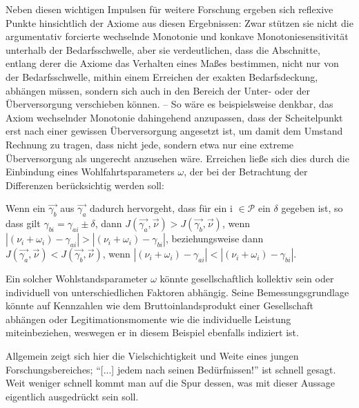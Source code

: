 \documentclass[a4paper]{thesis}
\begin{document}
Neben diesen wichtigen Impulsen für weitere Forschung ergeben sich reflexive Punkte hinsichtlich der Axiome aus diesen Ergebnissen: Zwar stützen sie nicht die argumentativ forcierte wechselnde Monotonie und konkave Monotoniesensitivität unterhalb der Bedarfsschwelle, aber sie verdeutlichen, dass die Abschnitte, entlang derer die Axiome das Verhalten eines Maßes bestimmen, nicht nur von der Bedarfsschwelle, mithin einem Erreichen der exakten Bedarfsdeckung, abhängen müssen, sondern sich auch in den Bereich der Unter- oder der Überversorgung verschieben können. -- So wäre es beispielsweise denkbar, das Axiom wechselnder Monotonie dahingehend anzupassen, dass der Scheitelpunkt erst nach einer gewissen Überversorgung angesetzt ist, um damit dem Umstand Rechnung zu tragen, dass nicht jede, sondern etwa nur eine extreme Überversorgung als ungerecht anzusehen wäre. Erreichen ließe sich dies durch die Einbindung eines Wohlfahrtsparameters $\omega$, der bei der Betrachtung der Differenzen berücksichtig werden soll:

\begin{Axiom}
Wenn ein $\vec{\gamma_b}$ aus $\vec{\gamma_a}$ dadurch hervorgeht, dass für ein i $\in\mathcal{P}$ ein $\delta$ gegeben ist, so dass gilt $\gamma_{bi}=\gamma_{ai}\pm\delta$, dann $J(\vec{\gamma_a},\vec{\nu})>J(\vec{\gamma_b},\vec{\nu})$, wenn $|(\nu_i + \omega_i) - \gamma_{ai}|>|(\nu_i + \omega_i) - \gamma_{bi}|$, beziehungsweise dann $J(\vec{\gamma_a},\vec{\nu})<J(\vec{\gamma_b},\vec{\nu})$, wenn $|(\nu_i + \omega_i) - \gamma_{ai}|<|(\nu_i + \omega_i) - \gamma_{bi}|$.
\end{Axiom}

Ein solcher Wohlstandsparameter $\omega$ könnte gesellschaftlich kollektiv sein oder individuell von unterschiedlichen Faktoren abhängig. Seine Bemessungsgrundlage könnte auf Kennzahlen wie dem Bruttoinlandsprodukt einer Gesellschaft abhängen oder Legitimationsmomente wie die individuelle Leistung miteinbeziehen, weswegen er in diesem Beispiel ebenfalls indiziert ist.

Allgemein zeigt sich hier die Vielschichtigkeit und Weite eines jungen Forschungsbereiches; \enquote{[...] jedem nach seinen Bedürfnissen!} ist schnell gesagt. Weit weniger schnell kommt man auf die Spur dessen, was mit dieser Aussage eigentlich ausgedrückt sein soll.

\cleardoublepage
\theendnotes

\cleardoublepage
\end{document}
